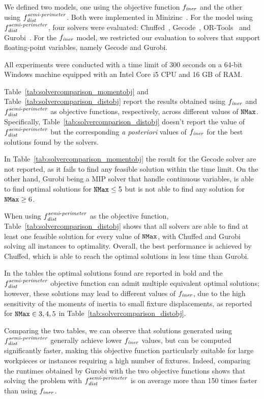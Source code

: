 We defined two models, one using the objective function $f_\mathit{iner}$ and the other using $f_{\mathit{dist}}^{\mathit{semi\text{-}perimeter}}$. Both were implemented in Minizinc~\cite{nethercote2007minizinc}. For the model using $f_{\mathit{dist}}^{\mathit{semi\text{-}perimeter}}$, four solvers were evaluated: Chuffed~\cite{chuffed}, Gecode~\cite{schulte2006gecode}, OR-Tools~\cite{ortools} and Gurobi~\cite{gurobi}. For the $f_\mathit{iner}$ model, we restricted our evaluation to solvers that support floating-point variables, namely Gecode and Gurobi.

All experiments were conducted with a time limit of 300 seconds on a 64-bit Windows machine equipped with an Intel Core i5 CPU and 16 GB of RAM. 

Table~\ref{tab:solvercomparison_momentobj} and Table~\ref{tab:solvercomparison_distobj} report the results obtained using $f_\mathit{iner}$ and $f_{\mathit{dist}}^{\mathit{semi\text{-}perimeter}}$ as objective functions, respectively, across different values of $\mathtt{NMax}$. Specifically, Table~\ref{tab:solvercomparison_distobj} doesn't report the value of $f_{\mathit{dist}}^{\mathit{semi\text{-}perimeter}}$ but the corresponding \emph{a posteriori} values of $f_\mathit{iner}$ for the best solutions found by the solvers.

In Table~\ref{tab:solvercomparison_momentobj} the result for the Gecode solver are not reported, as it fails to find any feasible solution within the time limit. On the other hand, Gurobi being a MIP solver that handle continuous variables, is able to find optimal solutions for $\mathtt{NMax} \leq 5$ but is not able to find any solution for $\mathtt{NMax} \geq 6$. 

When using $f_{\mathit{dist}}^{\mathit{semi\text{-}perimeter}}$ as the objective function, Table~\ref{tab:solvercomparison_distobj} shows that all solvers are able to find at least one feasible solution for every value of $\mathtt{NMax}$, with Chuffed and Gurobi solving all instances to optimality. Overall, the best performance is achieved by Chuffed, which is able to reach the optimal solutions in less time than Gurobi.

In the tables the optimal solutions found are reported in bold and the $f_{\mathit{dist}}^{\mathit{semi\text{-}perimeter}}$ objective function can admit multiple equivalent optimal solutions; however, these solutions may lead to different values of $f_\mathit{iner}$, due to the high sensitivity of the moments of inertia to small fixture displacements, as reported for $\mathtt{NMax} \in {3,4,5}$ in Table~\ref{tab:solvercomparison_distobj}.

Comparing the two tables, we can observe that solutions generated using $f_{\mathit{dist}}^{\mathit{semi\text{-}perimeter}}$ generally achieve lower $f_\mathit{iner}$ values, but can be computed significantly faster, making this objective function particularly suitable for large workpieces or instances requiring a high number of fixtures. Indeed, comparing the runtimes obtained by Gurobi with the two objective functions shows that solving the problem with $f_{\mathit{dist}}^{\mathit{semi\text{-}perimeter}}$ is on average more than 150 times faster than using $f_\mathit{iner}$.

